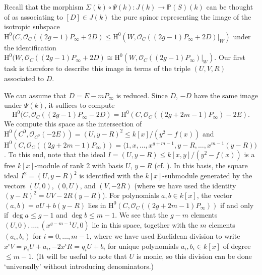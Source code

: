 \documentclass{article} %
\numberwithin{equation}{section}
\renewcommand{\P}{\mathbb{P}}
\newcommand{\HH}{\mathrm{H}}
\newcommand{\cO}{\mathcal{O}}
\begin{document}
Recall that the morphism $\Sigma(k) \circ \Psi(k) : J(k) \to \P(S)(k)$ can be thought of as associating to $[D] \in J(k)$ the pure spinor representing the image of the isotropic subspace $\HH^0(C, \cO_C((2g-1)P_\infty + 2D) \leq \HH^0(W, \cO_C((2g-1)P_\infty + 2D)|_W)$ under the identification $\HH^0(W, \cO_C((2g-1)P_\infty + 2D) \cong \HH^0(W, \cO_C((2g-1)P_\infty)|_W)$. Our first task is therefore to describe this image in terms of the triple $(U, V, R)$ associated to $D$.

We can assume that $D = E - m P_\infty$ is reduced. Since $D$, $-D$ have the same image under $\Psi(k)$, it suffices to compute
\[ \HH^0(C, \cO_C((2g-1)P_\infty - 2D) = \HH^0(C, \cO_C((2g+2m -1)P_\infty) - 2 E). \]
We compute this space as the intersection of $\HH^0(C^0, \cO_{C^0}(-2E)) = (U, y-R)^2 \leq k[x] / (y^2-f(x))$ and $\HH^0(C, \cO_C((2g+2m-1)P_\infty)) = \langle 1, x, \dots, x^{g+m-1}, y-R, \dots, x^{m-1}(y-R))$. To this end, note that the ideal $I = (U, y-R) \leq k[x,y] / (y^2 - f(x))$ is a free $k[x]$-module of rank 2 with basis $U$, $y-R$ (cf. \cite[\S 4]{Thorne-remark}). In this basis, the square ideal $I^2 = (U, y-R)^2$ is identified with the $k[x]$-submodule generated by the vectors $(U, 0)$, $(0, U)$, and $(V, -2R)$ (where we have used the identity $(y-R)^2 = UV - 2R(y-R)$). For polynomials $a, b \in k[x]$, the vector $(a, b) = a U + b(y-R)$ lies in   $\HH^0(C, \cO_C((2g+2m-1)P_\infty))$ if and only if $\deg a \leq g-1$ and $\deg b \leq m-1$. We see that the $g-m$ elements $(U, 0), \dots, (x^{g-m-1} U, 0)$ lie in this space, together with the $m$ elements $(a_i, b_i)$ for $i = 0, \dots, m-1$, where we have used Euclidean division to write $x^i V = p_i U + a_i, -2 x^i R = q_i U + b_i$ for unique polynomials $a_i, b_i \in k[x]$ of degree $\leq m-1$. (It will be useful to note that $U$ is monic, so this division can be done `universally' without introducing denominators.) 
\end{document}
